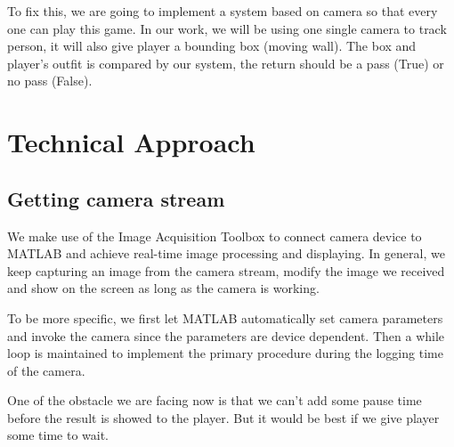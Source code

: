 \documentclass[conference,compsoc]{IEEEtran}
\begin{document}
	\par
		To fix this, we are going to implement a system based on camera so that every one can play this game.
		In our work, we will be using one single camera to track person, it will also give player a bounding box (moving wall).
		The box and player's outfit is compared by our system, the return should be a pass (True) or no pass (False).
\section{Technical Approach}
\subsection{Getting camera stream}
\par
We make use of the Image Acquisition Toolbox to connect camera device to MATLAB and achieve real-time image processing and displaying. In general, we keep capturing an image from the camera stream, modify the image we received and show on the screen as long as the camera is working.
\par
To be more specific, we first let MATLAB automatically set camera parameters and invoke the camera since the parameters are device dependent. Then a while loop is maintained to implement the primary procedure during the logging time of the camera.
\par
One of the obstacle we are facing now is that we can't add some pause time before the result is showed to the player. But it would be best if we give player some time to wait.
\end{document}

